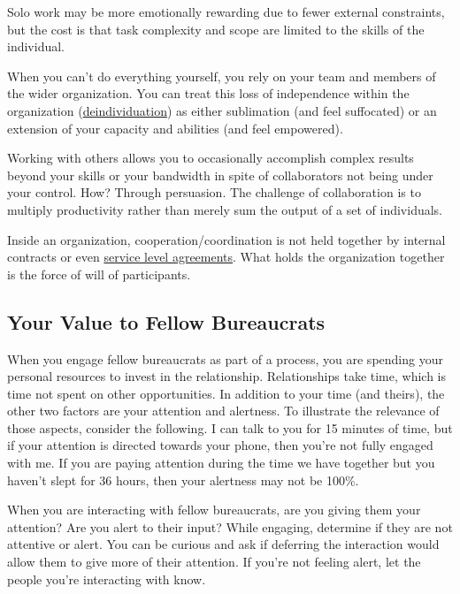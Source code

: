 Solo work may be more emotionally rewarding due to fewer external constraints, but the cost is that task complexity and scope are limited to the skills of the individual. 


When you can't do everything yourself, you rely on your team and members of the wider organization. You can treat this loss of independence within the organization (\href{https://en.wikipedia.org/wiki/Deindividuation}{deindividuation}) 
as either sublimation (and feel suffocated) or an extension of your capacity and abilities (and feel empowered).

Working with others allows you to occasionally accomplish complex results beyond your skills or your bandwidth in spite of collaborators not being under your control. How? Through persuasion. 
The challenge of collaboration is to multiply productivity rather than merely sum the output of a set of individuals. 

Inside an organization, cooperation/coordination is not held together by internal contracts or even \href{https://en.wikipedia.org/wiki/Service-level_agreement}{service level agreements}. 
What holds the organization together is the force of will of participants. 


\subsection*{Your Value to Fellow Bureaucrats}

When you engage fellow bureaucrats as part of a process, you are spending your personal resources to invest in the relationship. Relationships take time, which is time not spent on other opportunities. In addition to your time (and theirs), the other two factors are your attention and alertness. To illustrate the relevance of those aspects, consider the following. I can talk to you for 15 minutes of time, but if your attention is directed towards your phone, then you're not fully engaged with me. If you are paying attention during the time we have together but you haven't slept for 36 hours, then your alertness may not be 100\%. 

When you are interacting with fellow bureaucrats, are you giving them your attention? Are you alert to their input? While engaging, determine if they are not attentive or alert. You can be curious and ask if deferring the interaction would allow them to give more of their attention. If you're not feeling alert, let the people you're interacting with know.



